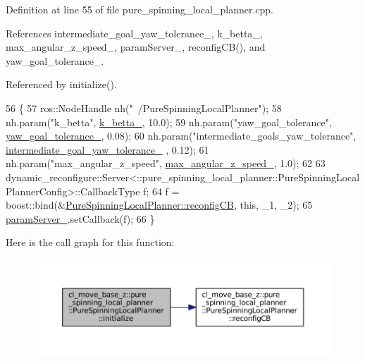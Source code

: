 Definition at line 55 of file pure\+\_\+spinning\+\_\+local\+\_\+planner.\+cpp.



References intermediate\+\_\+goal\+\_\+yaw\+\_\+tolerance\+\_\+, k\+\_\+betta\+\_\+, max\+\_\+angular\+\_\+z\+\_\+speed\+\_\+, param\+Server\+\_\+, reconfig\+C\+B(), and yaw\+\_\+goal\+\_\+tolerance\+\_\+.



Referenced by initialize().


\begin{DoxyCode}
56 \{
57   ros::NodeHandle nh(\textcolor{stringliteral}{"~/PureSpinningLocalPlanner"});
58   nh.param(\textcolor{stringliteral}{"k\_betta"}, \hyperlink{classcl__move__base__z_1_1pure__spinning__local__planner_1_1PureSpinningLocalPlanner_a379d2ba057231d76edd1a661d3572d68}{k\_betta\_}, 10.0);
59   nh.param(\textcolor{stringliteral}{"yaw\_goal\_tolerance"}, \hyperlink{classcl__move__base__z_1_1pure__spinning__local__planner_1_1PureSpinningLocalPlanner_a07334cd7bf29f391c2553f0038fa94e8}{yaw\_goal\_tolerance\_}, 0.08);
60   nh.param(\textcolor{stringliteral}{"intermediate\_goals\_yaw\_tolerance"}, \hyperlink{classcl__move__base__z_1_1pure__spinning__local__planner_1_1PureSpinningLocalPlanner_a2e8dfda5e9dea6f09db4056aa90b2aa8}{intermediate\_goal\_yaw\_tolerance\_}
      , 0.12);
61   nh.param(\textcolor{stringliteral}{"max\_angular\_z\_speed"}, \hyperlink{classcl__move__base__z_1_1pure__spinning__local__planner_1_1PureSpinningLocalPlanner_a20edb2db356925684de4ee4fe03d5992}{max\_angular\_z\_speed\_}, 1.0);
62 
63   dynamic\_reconfigure::Server<::pure\_spinning\_local\_planner::PureSpinningLocalPlannerConfig>::CallbackType 
      f;
64   f = boost::bind(&\hyperlink{classcl__move__base__z_1_1pure__spinning__local__planner_1_1PureSpinningLocalPlanner_a0caa25064ba8af05092feaad53e602b9}{PureSpinningLocalPlanner::reconfigCB}, \textcolor{keyword}{this}, \_1, \_2);
65   \hyperlink{classcl__move__base__z_1_1pure__spinning__local__planner_1_1PureSpinningLocalPlanner_a5e91943cf4500d35199004a09cc09ca4}{paramServer\_}.setCallback(f);
66 \}
\end{DoxyCode}
Here is the call graph for this function\+:
\nopagebreak
\begin{figure}[H]
\begin{center}
\leavevmode
\includegraphics[width=350pt]{classcl__move__base__z_1_1pure__spinning__local__planner_1_1PureSpinningLocalPlanner_a12fc5253f53f66e3e9735a72ebc9343f_cgraph}
\end{center}
\end{figure}
